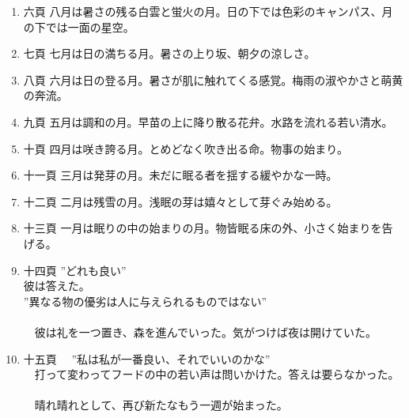 \documentclass{tarticle}
\begin{document}
\begin{enumerate}
\item 六頁
\label{sec:org9c92928}
\newline
八月は暑さの残る白雲と蛍火の月。日の下では色彩のキャンパス、月の下では一面の星空。\\

\item 七頁
\label{sec:orgde86625}
\newline
七月は日の満ちる月。暑さの上り坂、朝夕の涼しさ。\\

\item 八頁
\label{sec:org533519e}
\newline
六月は日の登る月。暑さが肌に触れてくる感覚。梅雨の淑やかさと萌黄の奔流。\\

\item 九頁
\label{sec:org01e360a}
\newline
五月は調和の月。早苗の上に降り散る花弁。水路を流れる若い清水。\\

\item 十頁
\label{sec:orgfa984e7}
\newline
四月は咲き誇る月。とめどなく吹き出る命。物事の始まり。\\

\item 十一頁
\label{sec:orge4213e0}
\newline
三月は発芽の月。未だに眠る者を揺する緩やかな一時。\\

\item 十二頁
\label{sec:org0425b99}
\newline
二月は残雪の月。浅眠の芽は嬉々として芽ぐみ始める。\\

\item 十三頁
\label{sec:orgfb5e42a}
\newline
一月は眠りの中の始まりの月。物皆眠る床の外、小さく始まりを告げる。\\

\item 十四頁
\label{sec:orgc8faeee}
\newline
  ”どれも良い”\\
彼は答えた。\\
”異なる物の優劣は人に与えられるものではない”\\
　\\
　彼は礼を一つ置き、森を進んでいった。気がつけば夜は開けていた。\\
\item 十五頁
\label{sec:orgf7aba07}
\newline
　”私は私が一番良い、それでいいのかな”\\
　打って変わってフードの中の若い声は問いかけた。答えは要らなかった。\\
　\\
　晴れ晴れとして、再び新たなもう一週が始まった。\\
\end{enumerate}
\end{document}
